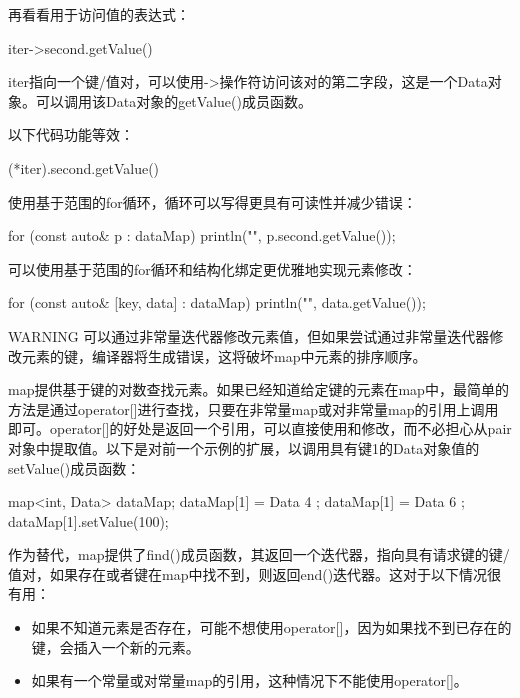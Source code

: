 再看看用于访问值的表达式：

\begin{cpp}
iter->second.getValue()
\end{cpp}

iter指向一个键/值对，可以使用->操作符访问该对的第二字段，这是一个Data对象。可以调用该Data对象的getValue()成员函数。

以下代码功能等效：

\begin{cpp}
(*iter).second.getValue()
\end{cpp}

使用基于范围的for循环，循环可以写得更具有可读性并减少错误：

\begin{cpp}
for (const auto& p : dataMap) {
    println("{}", p.second.getValue());
}
\end{cpp}

可以使用基于范围的for循环和结构化绑定更优雅地实现元素修改：

\begin{cpp}
for (const auto& [key, data] : dataMap) {
    println("{}", data.getValue());
}
\end{cpp}

\begin{myWarning}{WARNING}
可以通过非常量迭代器修改元素值，但如果尝试通过非常量迭代器修改元素的键，编译器将生成错误，这将破坏map中元素的排序顺序。
\end{myWarning}


map提供基于键的对数查找元素。如果已经知道给定键的元素在map中，最简单的方法是通过operator[]进行查找，只要在非常量map或对非常量map的引用上调用即可。operator[]的好处是返回一个引用，可以直接使用和修改，而不必担心从pair对象中提取值。以下是对前一个示例的扩展，以调用具有键1的Data对象值的setValue()成员函数：

\begin{cpp}
map<int, Data> dataMap;
dataMap[1] = Data { 4 };
dataMap[1] = Data { 6 };
dataMap[1].setValue(100);
\end{cpp}

作为替代，map提供了find()成员函数，其返回一个迭代器，指向具有请求键的键/值对，如果存在或者键在map中找不到，则返回end()迭代器。这对于以下情况很有用：

\begin{itemize}
\item
如果不知道元素是否存在，可能不想使用operator[]，因为如果找不到已存在的键，会插入一个新的元素。

\item
如果有一个常量或对常量map的引用，这种情况下不能使用operator[]。
\end{itemize}

